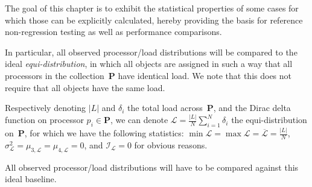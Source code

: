 The goal of this chapter is to exhibit the statistical properties of
some cases for which those can be explicitly calculated, hereby
providing the basis for reference non-regression testing as well as
performance comparisons.

In particular, all observed processor/load distributions will be
compared to the ideal \emph{equi-distribution}, in which all
objects are assigned in such a way that all processors in the
collection~$\mathbf{P}$ have identical load.
We note that this does not require that all objects have the same
load.

Respectively denoting $\vert{L}\vert$ and $\delta_i$ the total load
across~$\mathbf{P}$, and the Dirac delta function on processor
$p_i\in\mathbf{P}$, we can denote
$\mathcal{L}=\frac{\vert{L}\vert}{N}\sum_{i=1}^N\delta_i$ the
equi-distribution on~$\mathbf{P}$, for which we have 
the following statistics:
$\min{\mathcal{L}} = \max{\mathcal{L}}
= \overline{\mathcal{L}} = \frac{\vert{L}\vert{}}{N}$,
$\sigma_{\mathcal{L}}^2 = \mu_{3,\mathcal{L}} = \mu_{4,\mathcal{L}} = 0$,
and
$\mathcal{I}_{\mathcal{L}}= 0$
for obvious reasons.

All observed processor/load distributions will have to be compared
against this ideal baseline.

